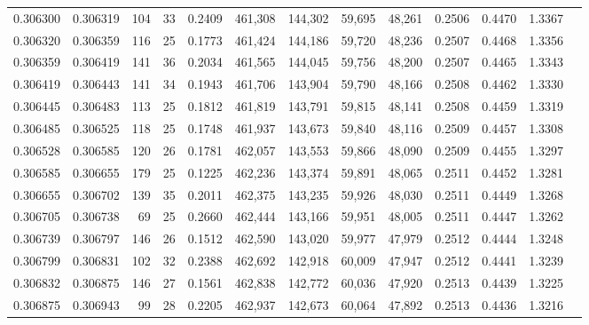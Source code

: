 \begin{tabular}{rrrrrrrrrrrrr}
0.306300 & 0.306319 &   104 &  33 &                                     0.2409 & 461,308 & 144,302 &  59,695 &  48,261 & 0.2506 & 0.4470 & 1.3367 \\
0.306320 & 0.306359 &   116 &  25 &                                     0.1773 & 461,424 & 144,186 &  59,720 &  48,236 & 0.2507 & 0.4468 & 1.3356 \\
0.306359 & 0.306419 &   141 &  36 &                                     0.2034 & 461,565 & 144,045 &  59,756 &  48,200 & 0.2507 & 0.4465 & 1.3343 \\
0.306419 & 0.306443 &   141 &  34 &                                     0.1943 & 461,706 & 143,904 &  59,790 &  48,166 & 0.2508 & 0.4462 & 1.3330 \\
0.306445 & 0.306483 &   113 &  25 &                                     0.1812 & 461,819 & 143,791 &  59,815 &  48,141 & 0.2508 & 0.4459 & 1.3319 \\
0.306485 & 0.306525 &   118 &  25 &                                     0.1748 & 461,937 & 143,673 &  59,840 &  48,116 & 0.2509 & 0.4457 & 1.3308 \\
0.306528 & 0.306585 &   120 &  26 &                                     0.1781 & 462,057 & 143,553 &  59,866 &  48,090 & 0.2509 & 0.4455 & 1.3297 \\
0.306585 & 0.306655 &   179 &  25 &                                     0.1225 & 462,236 & 143,374 &  59,891 &  48,065 & 0.2511 & 0.4452 & 1.3281 \\
0.306655 & 0.306702 &   139 &  35 &                                     0.2011 & 462,375 & 143,235 &  59,926 &  48,030 & 0.2511 & 0.4449 & 1.3268 \\
0.306705 & 0.306738 &    69 &  25 &                                     0.2660 & 462,444 & 143,166 &  59,951 &  48,005 & 0.2511 & 0.4447 & 1.3262 \\
0.306739 & 0.306797 &   146 &  26 &                                     0.1512 & 462,590 & 143,020 &  59,977 &  47,979 & 0.2512 & 0.4444 & 1.3248 \\
0.306799 & 0.306831 &   102 &  32 &                                     0.2388 & 462,692 & 142,918 &  60,009 &  47,947 & 0.2512 & 0.4441 & 1.3239 \\
0.306832 & 0.306875 &   146 &  27 &                                     0.1561 & 462,838 & 142,772 &  60,036 &  47,920 & 0.2513 & 0.4439 & 1.3225 \\
0.306875 & 0.306943 &    99 &  28 &                                     0.2205 & 462,937 & 142,673 &  60,064 &  47,892 & 0.2513 & 0.4436 & 1.3216 \\

\end{tabular}
